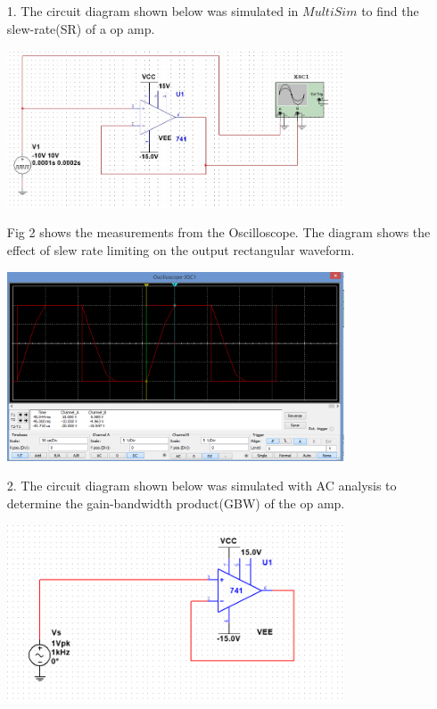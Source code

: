\documentclass[11pt,a4paper]{article}
\begin{document}
\begin{enumerate}
  \item[1.]
  The circuit diagram shown below was simulated in $MultiSim$ to find the slew-rate(SR) of a op amp.\\
    \begin{minipage}{\linewidth}
      \centering       
       \includegraphics[width=10cm]{Task1-1Circuit}\\
    \end{minipage}
    
Fig 2 shows the measurements from the Oscilloscope. The diagram shows the effect of slew rate limiting on the output rectangular waveform.\\
    \begin{minipage}{\linewidth}
      \centering       
       \includegraphics[width=10cm]{Task1-1-Oscilloscope}\\
    \end{minipage}
  
  \item[2.]
	The circuit diagram shown below was simulated with AC analysis to determine the gain-bandwidth product(GBW) of the op amp.  
  
      \begin{minipage}{\linewidth}
      \centering
        \includegraphics[width=10cm]{Task1-2-Circuit}\\
    \end{minipage}
    

\end{enumerate}
\end{document}
